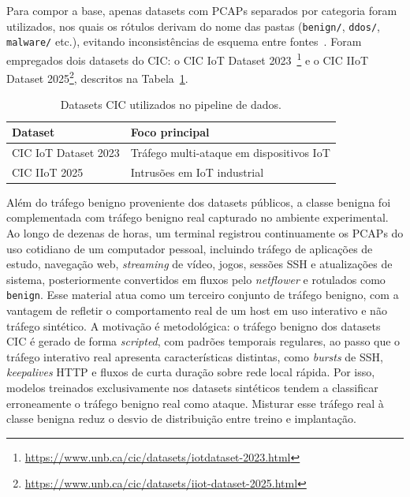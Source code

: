 \documentclass[12pt,a4paper]{article}
\begin{document}
Para compor a base, apenas datasets com PCAPs separados por categoria foram
utilizados, nos quais os rótulos derivam do nome das pastas (\texttt{benign/},
\texttt{ddos/}, \texttt{malware/} etc.), evitando inconsistências de esquema
entre fontes~\cite{sharafaldin:18}. Foram empregados dois datasets do
CIC: o CIC IoT Dataset
2023~\cite{neto:23}\footnote{\url{https://www.unb.ca/cic/datasets/iotdataset-2023.html}} e o
CIC IIoT Dataset 2025\footnote{\url{https://www.unb.ca/cic/datasets/iiot-dataset-2025.html}},
descritos na Tabela~\ref{tab:datasets}.

\begin{table}[ht]
\centering
\caption{Datasets CIC utilizados no pipeline de dados.}
\label{tab:datasets}
\begin{tabular}{@{}ll@{}}
\toprule
\textbf{Dataset} & \textbf{Foco principal} \\ \midrule
CIC IoT Dataset 2023 & Tráfego multi-ataque em dispositivos IoT \\
CIC IIoT 2025        & Intrusões em IoT industrial \\
\bottomrule
\end{tabular}
\end{table}

Além do tráfego benigno proveniente dos datasets públicos, a classe benigna foi
complementada com tráfego benigno real capturado no ambiente experimental. Ao
longo de dezenas de horas, um terminal registrou continuamente os PCAPs do uso
cotidiano de um computador pessoal, incluindo tráfego de aplicações de estudo,
navegação web, \textit{streaming} de vídeo, jogos, sessões SSH e atualizações
de sistema, posteriormente convertidos em fluxos pelo \textit{netflower} e
rotulados como \texttt{benign}. Esse material atua como um terceiro conjunto de
tráfego benigno, com a vantagem de refletir o comportamento real de um host em
uso interativo e não tráfego sintético. A motivação é metodológica: o tráfego
benigno dos datasets CIC é gerado de forma \textit{scripted}, com padrões
temporais regulares, ao passo que o tráfego interativo real apresenta
características distintas, como \textit{bursts} de SSH, \textit{keepalives}
HTTP e fluxos de curta duração sobre rede local rápida. Por isso, modelos
treinados exclusivamente nos datasets sintéticos tendem a classificar
erroneamente o tráfego benigno real como ataque. Misturar esse tráfego real à
classe benigna reduz o desvio de distribuição entre treino e implantação.
\end{document}
